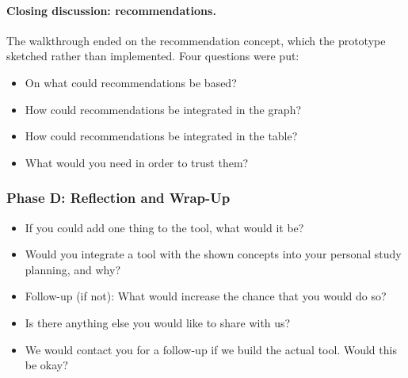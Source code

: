 \paragraph{Closing discussion: recommendations.}
The walkthrough ended on the recommendation concept, which the prototype sketched rather than implemented. Four questions were put:
\begin{itemize}
    \item On what could recommendations be based?
    \item How could recommendations be integrated in the graph?
    \item How could recommendations be integrated in the table?
    \item What would you need in order to trust them?
\end{itemize}

\subsubsection{Phase D: Reflection and Wrap-Up}

\begin{itemize}
    \item If you could add one thing to the tool, what would it be?
    \item Would you integrate a tool with the shown concepts into your personal study planning, and why?
    \item Follow-up (if not): What would increase the chance that you would do so?
    \item Is there anything else you would like to share with us?
    \item We would contact you for a follow-up if we build the actual tool. Would this be okay?
\end{itemize}

